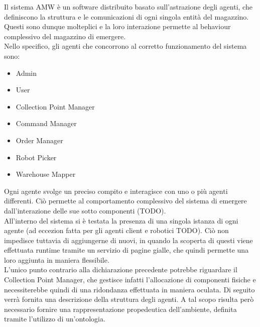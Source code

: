 Il sistema AMW è un software distribuito basato sull'astrazione degli agenti, che definiscono la struttura e le comunicazioni di ogni singola entità del magazzino. Questi sono dunque molteplici e la loro interazione permette al behaviour complessivo del magazzino di emergere.\\
Nello specifico, gli agenti che concorrono al corretto funzionamento del sistema sono:
\begin{itemize}
    \item Admin
    \item User
    \item Collection Point Manager
    \item Command Manager
    \item Order Manager
    \item Robot Picker
    \item Warehouse Mapper
\end{itemize}
Ogni agente svolge un preciso compito e interagisce con uno o più agenti differenti. Ciò permette al comportamento complessivo del sistema di emergere dall'interazione delle sue sotto componenti (TODO).\\
All'interno del sistema si è testata la presenza di una singola istanza di ogni agente (ad eccezion fatta per gli agenti client e robotici TODO). Ciò non impedisce tuttavia di aggiungerne di nuovi, in quando la scoperta di questi viene effettuata runtime tramite un servizio di pagine gialle, che quindi permette una loro aggiunta in maniera flessibile.\\
L'unico punto contrario alla dichiarazione precedente potrebbe riguardare il Collection Point Manager, che gestisce infatti l'allocazione di componenti fisiche e necessiterebbe quindi di una ridondanza effettuata in maniera oculata.
\parag
Di seguito verrà fornita una descrizione della struttura degli agenti. A tal scopo risulta però necessario fornire una rappresentazione propedeutica dell'ambiente, definita tramite l'utilizzo di un'ontologia.

